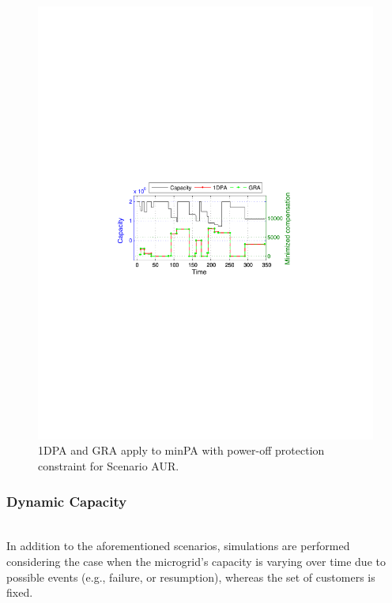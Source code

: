 \begin{figure}[!htb]\vspace{-5pt}
	\begin{center}
		\includegraphics[scale=0.6]{fig/minpatdc.pdf}
	\end{center}\vspace{-5pt}
\caption{{\sc 1DPA} and {\sc GRA} apply to {\sc minPA} with power-off protection constraint for Scenario AUR.}
	\label{fig:minpatdc}
\end{figure}

 \vspace{-5pt}
\subsubsection{Dynamic Capacity}~\\


In addition to the aforementioned scenarios, simulations are performed considering the case when the microgrid's capacity is varying over time due to possible events (e.g., failure, or resumption), whereas the set of customers is fixed. 

